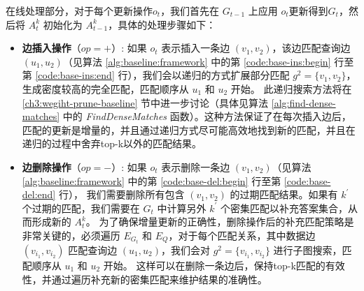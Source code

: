 在线处理部分，对于每个更新操作$o_t$，我们首先在 $G_{t-1}$ 上应用 $o_t$更新得到$G_t$，然后将 $A_t^k$ 初始化为 $A_{t-1}^k$，具体的处理步骤如下：
\begin{itemize}
    \item \textbf{边插入操作}（$op=+$）: 如果 $o_t$ 表示插入一条边 $(v_1, v_2)$，该边匹配查询边 $(u_1, u_2)$（见算法 \ref{alg:baseline:framework} 中的第 \ref{code:base-ins:begin} 行至第 \ref{code:base-ins:end} 行），我们会以递归的方式扩展部分匹配 $g^2 = \{v_1, v_2\}$，生成密度较高的完全匹配，匹配顺序从 $u_1$ 和 $u_2$ 开始。
    此递归搜索方法将在 \ref{ch3:wegiht-prune-baseline} 节中进一步讨论（具体见算法 \ref{alg:find-dense-matches} 中的 \emph{FindDenseMatches} 函数）。这种方法保证了在每次插入边后，匹配的更新是增量的，并且通过递归方式尽可能高效地找到新的匹配，并且在递归的过程中舍弃top-k以外的匹配结果。
    \item \textbf{边删除操作}（$op=-$）:  如果 $o_t$ 表示删除一条边 $(v_1, v_2)$（见算法 \ref{alg:baseline:framework} 中的第 \ref{code:base-del:begin} 行至第 \ref{code:base-del:end} 行），
    我们需要删除所有包含 $(v_1, v_2)$ 的过期匹配结果。如果有 $k^\prime$ 个过期的匹配，我们需要在 $G_t$ 中计算另外 $k^\prime$ 个密集匹配以补充答案集合，从而形成新的 $A_{t}^k$。
    为了确保增量更新的正确性，删除操作后的补充匹配策略是非常关键的，必须遍历 $E_{G_t}$ 和 $E_Q$，对于每个匹配关系，其中数据边 $(v_{i_1}, v_{i_2})$ 匹配查询边 $(u_1, u_2)$，我们会对 $g^2 = \{v_{i_1}, v_{i_2}\}$ 进行子图搜索，匹配顺序从 $u_1$ 和 $u_2$ 开始。
    这样可以在删除一条边后，保持top-k匹配的有效性，并通过遍历补充新的密集匹配来维护结果的准确性。
\end{itemize}
